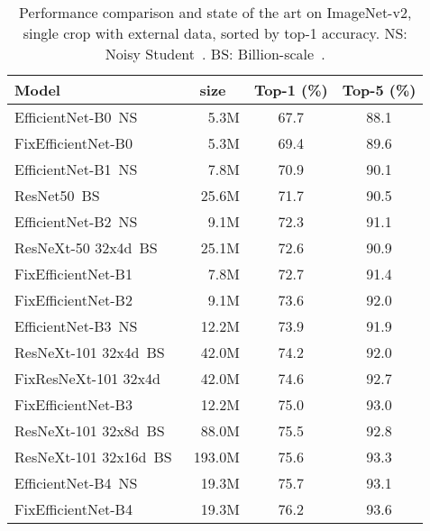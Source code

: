 \documentclass{article}
\begin{document}
\begin{table}
    \caption{\label{tab:=sota_ImageNet_V2}
     Performance comparison and state of the art on ImageNet-v2, single crop with external data, sorted by top-1 accuracy.  
     NS: Noisy Student~\cite{Xie2019SelftrainingWN}. BS: Billion-scale~\cite{Yalniz2019BillionscaleSL}. 
    }
    \smallskip
    
    \centering
    {\small
    \begin{tabular}{|l@{}r|cc|}
      \toprule
     Model & size \ &  Top-1 (\%)   &Top-5 (\%) \\
    \midrule

    EfficientNet-B0~NS~\cite{Xie2019SelftrainingWN}  & 5.3M & 67.7  & 88.1 \\
    FixEfficientNet-B0    & 5.3M & 69.4  & 89.6 \\
    
    EfficientNet-B1~NS~\cite{Xie2019SelftrainingWN}   & 7.8M & 70.9   & 90.1 \\
    ResNet50~BS~\cite{Yalniz2019BillionscaleSL}  &   25.6M   & 71.7  &  90.5 \\
    EfficientNet-B2~NS~\cite{Xie2019SelftrainingWN}  & 9.1M & 72.3   & 91.1 \\
    ResNeXt-50 32x4d~BS~\cite{Yalniz2019BillionscaleSL}  &   25.1M   & 72.6  &  90.9 \\
    FixEfficientNet-B1  &  7.8M & 72.7   & 91.4 \\
    FixEfficientNet-B2 & 9.1M & 73.6   & 92.0 \\
    
    EfficientNet-B3~NS~\cite{Xie2019SelftrainingWN}  & 12.2M & 73.9   & 91.9 \\
    ResNeXt-101 32x4d~BS~\cite{Yalniz2019BillionscaleSL}  &   42.0M   & 74.2  &  92.0 \\
    FixResNeXt-101 32x4d~\cite{Touvron2019FixRes}   &   42.0M   & 74.6  &  92.7 \\
    
    FixEfficientNet-B3  & 12.2M & 75.0   & 93.0 \\
    ResNeXt-101 32x8d~BS~\cite{Yalniz2019BillionscaleSL}  &   88.0M   & 75.5  &  92.8 \\
    ResNeXt-101 32x16d~BS~\cite{Yalniz2019BillionscaleSL}  &   193.0M   & 75.6  &  93.3 \\
    
    EfficientNet-B4~NS~\cite{Xie2019SelftrainingWN} & 19.3M & 75.7   & 93.1 \\
    FixEfficientNet-B4  & 19.3M & 76.2   & 93.6 \\
    

\end{tabular}}
\end{table}
\end{document}
